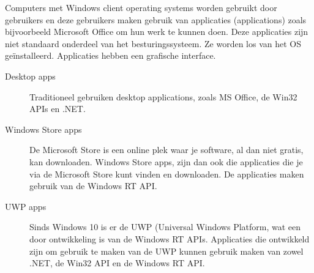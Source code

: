 Computers met Windows client operating systems worden gebruikt door gebruikers en deze gebruikers maken gebruik van applicaties (applications) zoals bijvoorbeeld Microsoft Office om hun werk te kunnen doen. Deze applicaties zijn niet standaard onderdeel van het besturingssysteem. Ze worden los van het OS ge\"installeerd. Applicaties hebben een grafische interface.

\begin{description}
\item[Desktop apps] Traditioneel gebruiken desktop applications, zoals MS Office, de Win32 APIs en .NET.
\item[Windows Store apps] De Microsoft Store is een online plek waar je software, al dan niet gratis, kan downloaden. Windows Store apps, zijn dan ook die applicaties die je via de Microsoft Store kunt vinden en downloaden. De applicaties maken gebruik van de Windows RT API.
\item[UWP apps] Sinds Windows 10 is er de UWP (Universal Windows Platform, wat een door ontwikkeling is van de Windows RT APIs. Applicaties die ontwikkeld zijn om gebruik te maken van de UWP kunnen gebruik maken van zowel .NET, de Win32 API en de Windows RT API.
\end{description}
